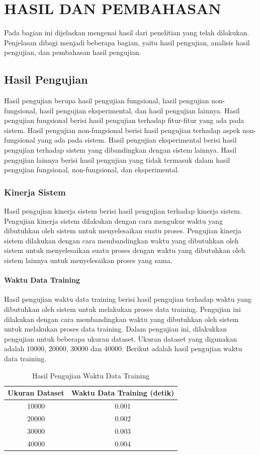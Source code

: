 \chapter{HASIL DAN PEMBAHASAN}
Pada bagian ini dijelaskan mengenai hasil dari penelitian yang telah dilakukan. Penjelasan dibagi menjadi beberapa bagian, yaitu hasil pengujian, analisis hasil pengujian, dan pembahasan hasil pengujian.

\section{Hasil Pengujian}
Hasil pengujian berupa hasil pengujian fungsional, hasil pengujian non-fungsional, hasil pengujian eksperimental, dan hasil pengujian lainnya. Hasil pengujian fungsional berisi hasil pengujian terhadap fitur-fitur yang ada pada sistem. Hasil pengujian non-fungsional berisi hasil pengujian terhadap aspek non-fungsional yang ada pada sistem. Hasil pengujian eksperimental berisi hasil pengujian terhadap sistem yang dibandingkan dengan sistem lainnya. Hasil pengujian lainnya berisi hasil pengujian yang tidak termasuk dalam hasil pengujian fungsional, non-fungsional, dan eksperimental.

\subsection{Kinerja Sistem}
Hasil pengujian kinerja sistem berisi hasil pengujian terhadap kinerja sistem. Pengujian kinerja sistem dilakukan dengan cara mengukur waktu yang dibutuhkan oleh sistem untuk menyelesaikan suatu proses. Pengujian kinerja sistem dilakukan dengan cara membandingkan waktu yang dibutuhkan oleh sistem untuk menyelesaikan suatu proses dengan waktu yang dibutuhkan oleh sistem lainnya untuk menyelesaikan proses yang sama.

\subsubsection{Waktu Data Training}
Hasil pengujian waktu data training berisi hasil pengujian terhadap waktu yang dibutuhkan oleh sistem untuk melakukan proses data training. Pengujian ini dilakukan dengan cara membandingkan waktu yang dibutuhkan oleh sistem untuk melakukan proses data training.
Dalam pengujian ini, dilakukkan pengujian untuk beberapa ukuran dataset. Ukuran dataset yang digunakan adalah 10000, 20000, 30000 dan 40000. 
Berikut adalah hasil pengujian waktu data training.

\begin{table}[h]
    \centering
    \begin{tabular}{|c|c|}
    \hline
    \textbf{Ukuran Dataset} & \textbf{Waktu Data Training (detik)} \\
    \hline
    10000 & 0.001 \\
    \hline
    20000 & 0.002 \\
    \hline
    30000 & 0.003 \\
    \hline
    40000 & 0.004 \\
    \hline
    \end{tabular}
    \caption{Hasil Pengujian Waktu Data Training}
    \label{table:1}
\end{table}



